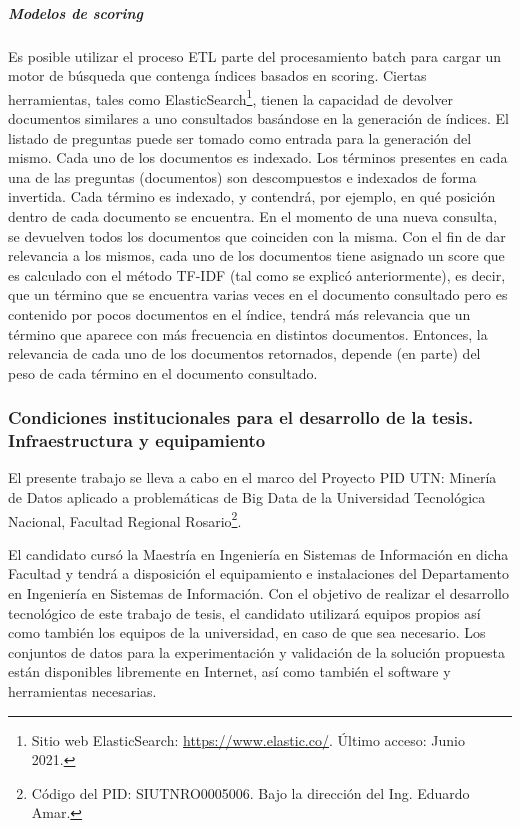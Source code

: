\subparagraph{Modelos de scoring}
Es posible utilizar el proceso ETL parte del procesamiento batch para cargar un motor de búsqueda que contenga índices basados en scoring. Ciertas herramientas, tales como ElasticSearch\footnote{Sitio web ElasticSearch: \url{https://www.elastic.co/}. Último acceso: Junio 2021.}, tienen la capacidad de devolver documentos similares a uno consultados basándose en la generación de índices. El listado de preguntas puede ser tomado como entrada para la generación del mismo. Cada uno de los documentos es indexado. Los términos presentes en cada una de las preguntas (documentos) son descompuestos e indexados de forma invertida. Cada término es  indexado, y contendrá, por ejemplo, en qué posición dentro de cada documento se encuentra. En el momento de una nueva consulta, se devuelven todos los documentos que coinciden con la misma. Con el fin de dar relevancia a los mismos, cada uno de los documentos tiene asignado un score que es calculado con el método TF-IDF (tal como se explicó anteriormente), es decir, que un término que se encuentra varias veces en el documento consultado pero es contenido por pocos documentos en el índice, tendrá más relevancia que un término que aparece con más frecuencia en distintos documentos. Entonces, la relevancia de cada uno de los documentos retornados, depende (en parte) del peso de cada término en el documento consultado.

\subsubsection{Condiciones institucionales para el desarrollo de la tesis. Infraestructura y equipamiento}
El presente trabajo se lleva a cabo en el marco del Proyecto PID UTN: Minería de Datos aplicado a problemáticas de Big Data de la Universidad Tecnológica Nacional, Facultad Regional Rosario\footnote{Código del PID: SIUTNRO0005006. Bajo la dirección del Ing. Eduardo Amar.}.

\bigskip El candidato cursó la Maestría en Ingeniería en Sistemas de Información en dicha Facultad y tendrá a disposición el equipamiento e instalaciones del Departamento en Ingeniería en Sistemas de Información. Con el objetivo de realizar el desarrollo tecnológico de este trabajo de tesis, el candidato utilizará equipos propios así como también los equipos de la universidad, en caso de que sea necesario. Los conjuntos de datos para la experimentación y validación de la solución propuesta están disponibles libremente en Internet, así como también el software y herramientas necesarias.

















